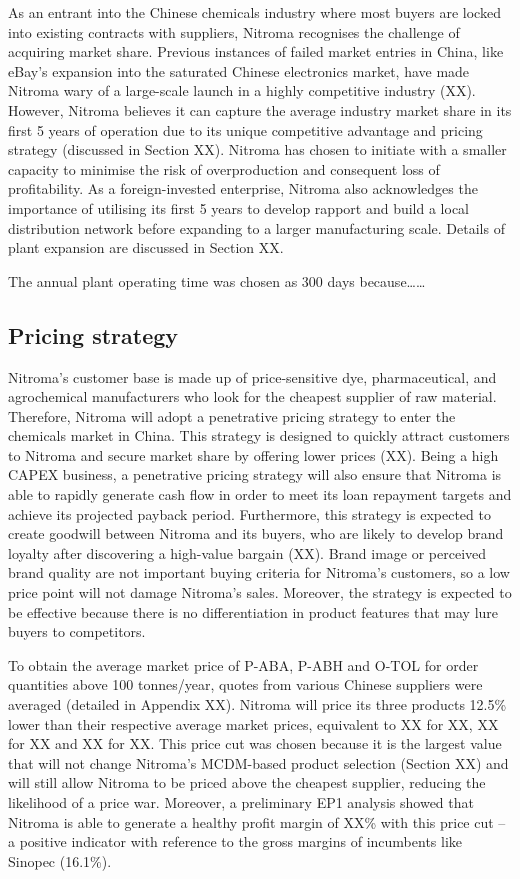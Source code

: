 As an entrant into the Chinese chemicals industry where most buyers are locked into existing contracts with suppliers, Nitroma recognises the challenge of acquiring market share. Previous instances of failed market entries in China, like eBay’s expansion into the saturated Chinese electronics market, have made Nitroma wary of a large-scale launch in a highly competitive industry (XX). However, Nitroma believes it can capture the average industry market share in its first 5 years of operation due to its unique competitive advantage and pricing strategy (discussed in Section XX). Nitroma has chosen to initiate with a smaller capacity to minimise the risk of overproduction and consequent loss of profitability. As a foreign-invested enterprise, Nitroma also acknowledges the importance of utilising its first 5 years to develop rapport and build a local distribution network before expanding to a larger manufacturing scale. Details of plant expansion are discussed in Section XX.

The annual plant operating time was chosen as 300 days because……

\subsection{Pricing strategy}
Nitroma’s customer base is made up of price-sensitive dye, pharmaceutical, and agrochemical manufacturers who look for the cheapest supplier of raw material. Therefore, Nitroma will adopt a penetrative pricing strategy to enter the chemicals market in China. This strategy is designed to quickly attract customers to Nitroma and secure market share by offering lower prices (XX). Being a high CAPEX business, a penetrative pricing strategy will also ensure that Nitroma is able to rapidly generate cash flow in order to meet its loan repayment targets and achieve its projected payback period. Furthermore, this strategy is expected to create goodwill between Nitroma and its buyers, who are likely to develop brand loyalty after discovering a high-value bargain (XX). Brand image or perceived brand quality are not important buying criteria for Nitroma’s customers, so a low price point will not damage Nitroma’s sales. Moreover, the strategy is expected to be effective because there is no differentiation in product features that may lure buyers to competitors.

To obtain the average market price of P-ABA, P-ABH and O-TOL for order quantities above 100 tonnes/year, quotes from various Chinese suppliers were averaged (detailed in Appendix XX).  Nitroma will price its three products 12.5\% lower than their respective average market prices, equivalent to XX for XX, XX for XX and XX for XX. This price cut was chosen because it is the largest value that will not change Nitroma’s MCDM-based product selection (Section XX) and will still allow Nitroma to be priced above the cheapest supplier, reducing the likelihood of a price war. Moreover, a preliminary EP1 analysis showed that Nitroma is able to generate a healthy profit margin of XX\% with this price cut – a positive indicator with reference to the gross margins of incumbents like Sinopec (16.1\%). 


